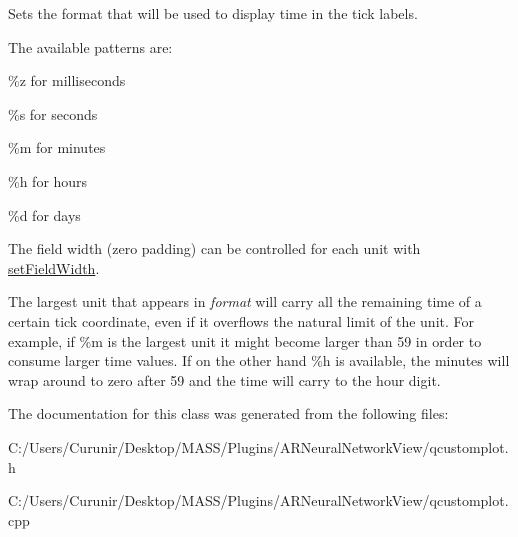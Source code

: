 Sets the format that will be used to display time in the tick labels.

The available patterns are\+:
\begin{DoxyItemize}
\item \%z for milliseconds
\item \%s for seconds
\item \%m for minutes
\item \%h for hours
\item \%d for days
\end{DoxyItemize}

The field width (zero padding) can be controlled for each unit with \hyperlink{class_q_c_p_axis_ticker_time_adc13e54fc969be98a5c0e3fa0dbaa293}{set\+Field\+Width}.

The largest unit that appears in {\itshape format} will carry all the remaining time of a certain tick coordinate, even if it overflows the natural limit of the unit. For example, if \%m is the largest unit it might become larger than 59 in order to consume larger time values. If on the other hand \%h is available, the minutes will wrap around to zero after 59 and the time will carry to the hour digit. 

The documentation for this class was generated from the following files\+:\begin{DoxyCompactItemize}
\item 
C\+:/\+Users/\+Curunir/\+Desktop/\+M\+A\+S\+S/\+Plugins/\+A\+R\+Neural\+Network\+View/qcustomplot.\+h\item 
C\+:/\+Users/\+Curunir/\+Desktop/\+M\+A\+S\+S/\+Plugins/\+A\+R\+Neural\+Network\+View/qcustomplot.\+cpp\end{DoxyCompactItemize}
